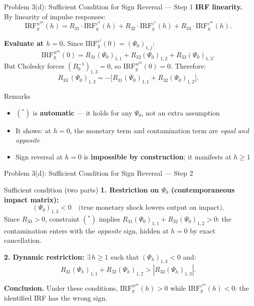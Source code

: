 \documentclass[aspectratio=169,11pt]{beamer}
\begin{document}
\begin{frame}{Problem 3(d): Sufficient Condition for Sign Reversal --- Step 1}
    \textbf{IRF linearity.} By linearity of impulse responses:
    \[
    \text{IRF}_y^{w^m}(h) = R_{31}\cdot\text{IRF}_y^{\varepsilon^a}(h) + R_{32}\cdot\text{IRF}_y^{\varepsilon^c}(h) + R_{33}\cdot\text{IRF}_y^{\varepsilon^m}(h).
    \]

    \textbf{Evaluate at $h=0$.} Since $\text{IRF}_y^{\varepsilon^j}(0) = (\Psi_0)_{1,j}$:
    \[
    \text{IRF}_y^{w^m}(0) = R_{31}(\Psi_0)_{1,1} + R_{32}(\Psi_0)_{1,2} + R_{33}(\Psi_0)_{1,3}.
    \]
    But Cholesky forces $(B_0^{-1})_{1,3} = 0$, so $\text{IRF}_y^{w^m}(0) = 0$. Therefore:
    \[
    R_{33}\,(\Psi_0)_{1,3} = -\bigl[R_{31}(\Psi_0)_{1,1} + R_{32}(\Psi_0)_{1,2}\bigr]. \tag{$*$}
    \]

    \begin{block}{Remarks}
        \begin{itemize}
            \item $(^*)$ is \textbf{automatic} --- it holds for any $\Psi_0$, not an extra assumption
            \item It shows: at $h=0$, the monetary term and contamination term are \textit{equal and opposite}
            \item Sign reversal at $h=0$ is \textbf{impossible by construction}; it manifests at $h\geq1$
        \end{itemize}
    \end{block}
\end{frame}

\begin{frame}{Problem 3(d): Sufficient Condition for Sign Reversal --- Step 2}
    \begin{alertblock}{Sufficient condition (two parts)}
        \textbf{1. Restriction on $\Psi_0$ (contemporaneous impact matrix):}
        \[
        (\Psi_0)_{1,3} < 0 \quad \text{(true monetary shock lowers output on impact).}
        \]
        Since $R_{33}>0$, constraint $(^*)$ implies $R_{31}(\Psi_0)_{1,1}+R_{32}(\Psi_0)_{1,2}>0$: the contamination enters with the \textit{opposite} sign, hidden at $h=0$ by exact cancellation.

        \vspace{0.4em}
        \textbf{2. Dynamic restriction:} $\exists\, h\geq1$ such that $(\Psi_h)_{1,3}<0$ and:
        \[
        R_{31}(\Psi_h)_{1,1} + R_{32}(\Psi_h)_{1,2} > |R_{33}(\Psi_h)_{1,3}|.
        \]
    \end{alertblock}

    \vspace{0.2em}
    \textbf{Conclusion.} Under these conditions, $\text{IRF}_y^{w^m}(h) > 0$ while $\text{IRF}_y^{\varepsilon^m}(h) < 0$: \textcolor{mitred}{the identified IRF has the wrong sign.}

\end{frame}
\end{document}

